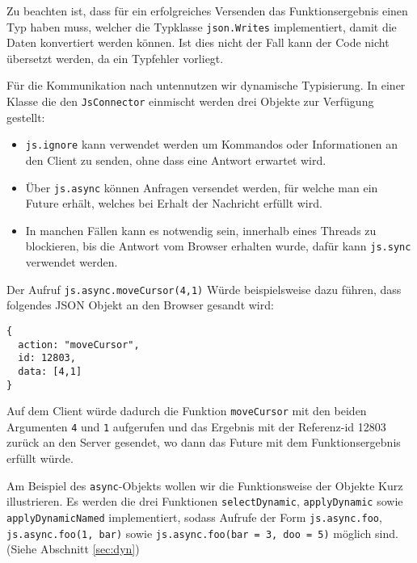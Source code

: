 Zu beachten ist, dass für ein erfolgreiches Versenden das Funktionsergebnis einen Typ haben muss,
welcher die Typklasse \texttt{json.Writes} implementiert, damit die Daten konvertiert werden können.
Ist dies nicht der Fall kann der Code nicht übersetzt werden, da ein Typfehler vorliegt.

Für die Kommunikation nach \glqq unten\grqq nutzen wir dynamische Typisierung. In einer Klasse die
den \texttt{JsConnector} einmischt werden drei Objekte zur Verfügung gestellt:

\begin{itemize}
  \item \texttt{js.ignore} kann verwendet werden um Kommandos oder Informationen an den Client zu 
  senden, ohne dass eine Antwort erwartet wird.
  \item Über \texttt{js.async} können Anfragen versendet werden, für welche man ein Future erhält, 
  welches bei Erhalt der Nachricht erfüllt wird.
  \item In manchen Fällen kann es notwendig sein, innerhalb eines Threads zu blockieren, bis die 
  Antwort vom Browser erhalten wurde, dafür kann \texttt{js.sync} verwendet werden.
\end{itemize}

Der Aufruf \texttt{js.async.moveCursor(4,1)} Würde beispielsweise dazu führen, dass folgendes JSON
Objekt an den Browser gesandt wird:

\begin{lstlisting}
{
  action: "moveCursor",
  id: 12803,
  data: [4,1]
}
\end{lstlisting}

Auf dem Client würde dadurch die Funktion \texttt{moveCursor} mit den beiden Argumenten \texttt{4}
und \texttt{1} aufgerufen und das Ergebnis mit der Referenz-id 12803 zurück an den Server gesendet,
wo dann das Future mit dem Funktionsergebnis erfüllt würde.

Am Beispiel des \texttt{async}-Objekts wollen wir die Funktionsweise der Objekte Kurz illustrieren.
Es werden die drei Funktionen \texttt{selectDynamic}, \texttt{applyDynamic} sowie
\texttt{applyDynamicNamed} implementiert, sodass Aufrufe der Form \texttt{js.async.foo},
\texttt{js.async.foo(1, bar)} sowie \texttt{js.async.foo(bar = 3, doo = 5)} möglich sind. (Siehe
Abschnitt \ref{sec:dyn})

